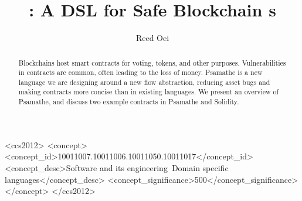 \documentclass[dvipsnames, sigplan, screen]{acmart}
\begin{document}
\title{\langName: A DSL for Safe Blockchain \AssetTxt{}s}

\author{Reed Oei}

\begin{abstract}
Blockchains host smart contracts for voting, tokens, and other purposes.
Vulnerabilities in contracts are common, often leading to the loss of money.
Psamathe is a new language we are designing around a new flow abstraction, reducing asset bugs and making contracts more concise than in existing languages.
We present an overview of Psamathe, and discuss two example contracts in Psamathe and Solidity.
\end{abstract}

\begin{CCSXML}
<ccs2012>
<concept>
<concept_id>10011007.10011006.10011050.10011017</concept_id>
<concept_desc>Software and its engineering~Domain specific languages</concept_desc>
<concept_significance>500</concept_significance>
</concept>
</ccs2012>
\end{CCSXML}



\maketitle
\end{document}
